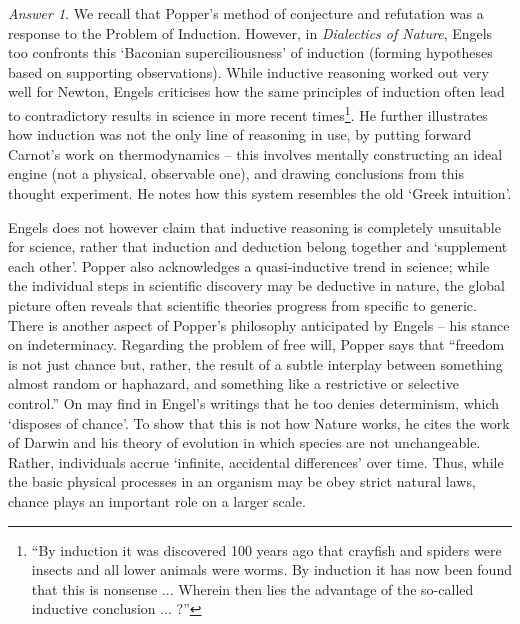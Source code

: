 \documentclass[11pt]{article}
\theoremstyle{remark}
\newtheorem*{answer}{Answer}
\begin{document}
\begin{answer}
        We recall that Popper's method of conjecture and refutation was a response to
        the Problem of Induction.  However, in \emph{Dialectics of Nature}, Engels
        too confronts this `Baconian superciliousness' of induction (forming
        hypotheses based on supporting observations). While inductive reasoning
        worked out very well for Newton, Engels criticises how the same principles of
        induction often lead to contradictory results in science in more recent
        times\footnote{``By induction it was discovered 100 years ago that crayfish
        and spiders were insects and all lower animals were worms. By induction it
        has now been found that this is nonsense ... Wherein then lies the advantage
        of the so-called inductive conclusion ... ?''}. He further illustrates how
        induction was not the only line of reasoning in use, by putting forward
        Carnot's work on thermodynamics -- this involves mentally constructing an
        ideal engine (not a physical, observable one), and drawing conclusions from
        this thought experiment. He notes how this system resembles the old `Greek
        intuition'.

        Engels does not however claim that inductive reasoning is completely
        unsuitable for science, rather that induction and deduction belong together
        and `supplement each other'. Popper also acknowledges a quasi-inductive trend
        in science; while the individual steps in scientific discovery may be
        deductive in nature, the global picture often reveals that scientific
        theories progress from specific to generic. \\

        There is another aspect of Popper's philosophy anticipated by Engels -- his
        stance on indeterminacy. Regarding the problem of free will, Popper says that
        ``freedom is not just chance but, rather, the result of a subtle interplay
        between something almost random or haphazard, and something like a
        restrictive or selective control.'' On may find in Engel's writings that he
        too denies determinism, which `disposes of chance'. To show that this is not
        how Nature works, he cites the work of Darwin and his theory of evolution in
        which species are not unchangeable. Rather, individuals accrue `infinite,
        accidental differences' over time. Thus, while the basic physical processes
        in an organism may be obey strict natural laws, chance plays an important
        role on a larger scale.
    \end{answer}
\end{document}
